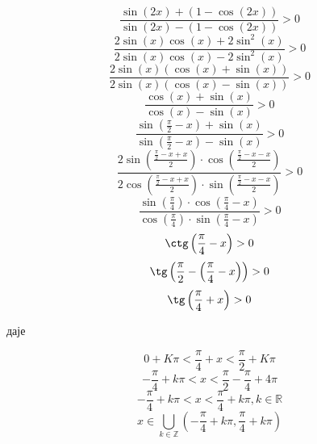 \documentclass[../diplomski.tex]{subfiles}
\begin{document}
\[\frac{\sin(2x)+(1-\cos(2x))}{\sin(2x)-(1-\cos(2x))}>0\]
\[\frac{2\sin(x)\cos(x)+2\sin^{2}(x)}{2\sin(x)\cos(x)-2\sin^{2}(x)}>0\]
\[\frac{2\sin(x)(\cos(x)+\sin(x))}{2\sin(x)(\cos(x)-\sin(x))}>0\]
\[\frac{\cos(x)+\sin(x)}{\cos(x)-\sin(x)}>0\]
\[\frac{\sin\left(\frac{\pi}{2}-x\right)+\sin(x)}{\sin\left(\frac{\pi}{2}-x\right)-\sin(x)}>0\]
\[\frac{2\sin\left(\frac{\frac{\pi}{2}-x+x}{2}\right)\cdot\cos\left(\frac{\frac{\pi}{2}-x-x}{2}\right)}{2\cos\left(\frac{\frac{\pi}{2}-x+x}{2}\right)\cdot\sin\left(\frac{\frac{\pi}{2}-x-x}{2}\right)}>0\]
\[\frac{\sin\left(\frac{\pi}{4}\right)\cdot\cos\left(\frac{\pi}{4}-x\right)}{\cos\left(\frac{\pi}{4}\right)\cdot\sin\left(\frac{\pi}{4}-x\right)}>0\]
\[\ctg\left(\frac{\pi}{4}-x\right)>0\]
\[\tg\left(\frac{\pi}{2}-\left(\frac{\pi}{4}-x\right)\right)>0\]
\[\tg\left(\frac{\pi}{4}+x\right)>0\]
\centerline{даје}
\[0+K\pi<\frac{\pi}{4}+x<\frac{\pi}{2}+K\pi\]
\[-\frac{\pi}{4}+k\pi<x<\frac{\pi}{2}-\frac{\pi}{4}+4\pi\]
\[-\frac{\pi}{4}+k\pi<x<\frac{\pi}{4}+k\pi,k\in\mathbb{R}\]
\[x\in\bigcup_{k\in\mathbb{Z}}\left(-\frac{\pi}{4}+k\pi,\frac{\pi}{4}+k\pi\right)\]
\end{document}
